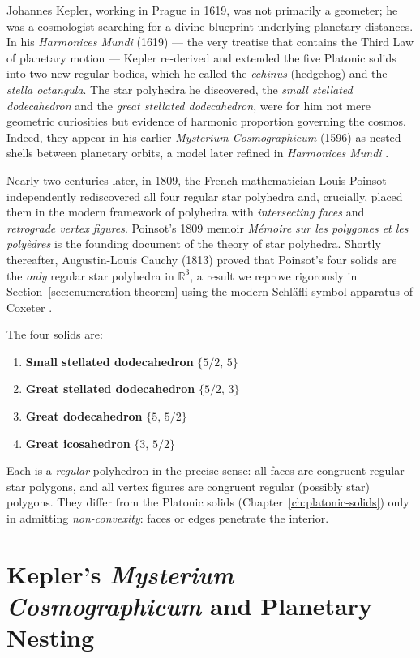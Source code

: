 Johannes Kepler, working in Prague in 1619, was not primarily
a geometer; he was a cosmologist searching for a divine
blueprint underlying planetary distances.  In his
\emph{Harmonices Mundi} (1619) — the very treatise that
contains the Third Law of planetary motion — Kepler re-derived
and extended the five Platonic solids into two new regular
bodies, which he called the \emph{echinus} (hedgehog) and the
\emph{stella octangula}.  The star polyhedra he discovered,
the \emph{small stellated dodecahedron} and the \emph{great
stellated dodecahedron}, were for him not mere geometric
curiosities but evidence of harmonic proportion governing the
cosmos.  Indeed, they appear in his earlier \emph{Mysterium
Cosmographicum} (1596) as nested shells between planetary
orbits, a model later refined in \emph{Harmonices Mundi}
\cite{cromwell_polyhedra}.

Nearly two centuries later, in 1809, the French mathematician
Louis Poinsot independently rediscovered all four regular star
polyhedra and, crucially, placed them in the modern framework
of polyhedra with \emph{intersecting faces} and
\emph{retrograde vertex figures}.  Poinsot's 1809 memoir
\emph{Mémoire sur les polygones et les polyèdres} is the
founding document of the theory of star polyhedra.  Shortly
thereafter, Augustin-Louis Cauchy (1813) proved that Poinsot's
four solids are the \emph{only} regular star polyhedra in
\(\mathbb{R}^3\), a result we reprove rigorously in
Section~\ref{sec:enumeration-theorem} using the modern
Schläfli-symbol apparatus of Coxeter
\cite{coxeter_regular_polytopes}.

The four solids are:
\begin{enumerate}
  \item \textbf{Small stellated dodecahedron} \(\{5/2,\,5\}\)
  \item \textbf{Great stellated dodecahedron} \(\{5/2,\,3\}\)
  \item \textbf{Great dodecahedron} \(\{5,\,5/2\}\)
  \item \textbf{Great icosahedron} \(\{3,\,5/2\}\)
\end{enumerate}
Each is a \emph{regular} polyhedron in the precise sense: all
faces are congruent regular star polygons, and all vertex
figures are congruent regular (possibly star) polygons.  They
differ from the Platonic solids (Chapter~\ref{ch:platonic-solids})
only in admitting \emph{non-convexity}: faces or edges
penetrate the interior.

\section{Kepler's \emph{Mysterium Cosmographicum} and Planetary Nesting}
\label{sec:mysterium}

